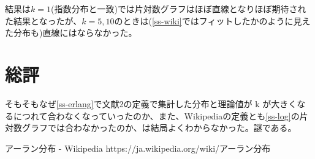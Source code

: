 \documentclass[a4paper,twoside]{jarticle}
\begin{document}
結果は$k=1$(指数分布と一致)では片対数グラフはほぼ直線となりほぼ期待された結果となったが、$k=5,10$のときは(\ref{ss-wiki}ではフィットしたかのように見えた分布も)直線にはならなかった。

\section{総評}
そもそもなぜ\ref{ss-erlang}で文献2の定義で集計した分布と理論値が k が大きくなるにつれて合わなくなっていったのか、また、Wikipedia\cite{wiki-erlang}の定義とも\ref{ss-log}の片対数グラフでは合わなかったのか、は結局よくわからなかった。謎である。

\begin{thebibliography}{99}
アーラン分布 - Wikipedia
https://ja.wikipedia.org/wiki/アーラン分布

\end{thebibliography}
\end{document}

